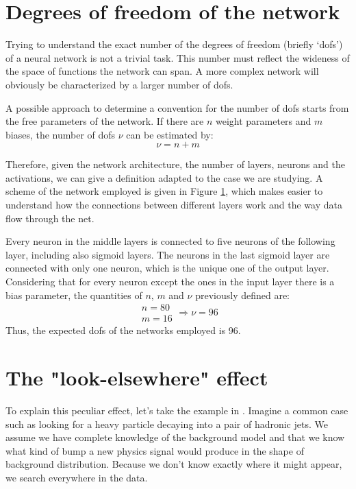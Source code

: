 \section{Degrees of freedom of the network}
Trying to understand the exact number of the degrees of freedom (briefly `dofs') of a neural network is not a trivial task. This number must reflect the wideness of the space of functions the network can span. A more complex network will obviously be characterized by a larger number of dofs.

A possible approach to determine a convention for the number of dofs starts from the free parameters of the network. If there are $n$ weight parameters and $m$ biases, the number of dofs $\nu$ can be estimated by:
\begin{equation}
	\nu = n + m
\end{equation}

Therefore, given the network architecture, the number of layers, neurons and the activations, we can give a definition adapted to the case we are studying. A scheme of the network employed is given in Figure \ref{fig:DOF}, which makes easier to understand how the connections between different layers work and the way data flow through the net.

\begin{figure}[H]
    \centering
    
    \label{fig:DOF}
\end{figure}

Every neuron in the middle layers is connected to five neurons of the following layer, including also sigmoid layers. The neurons in the last sigmoid layer are connected with only one neuron, which is the unique one of the output layer. Considering that for every neuron except the ones in the input layer there is a bias parameter, the quantities of $n$, $m$ and $\nu$ previously defined are:
\begin{equation}
	\begin{array}{l}
	n = 80\\
	m = 16
	\end{array}
	\Longrightarrow
	\nu = 96
\end{equation}
Thus, the expected dofs of the networks employed is 96.



\section{The "look-elsewhere" effect}
To explain this peculiar effect, let's take the example in \cite{look-elsewhere}. Imagine a common case such as looking for a heavy particle decaying into a pair of hadronic jets. We assume we have complete knowledge of the background model and that we know what kind of bump a new physics signal would produce in the shape of background distribution. Because we don't know exactly where it might appear, we search everywhere in the data.

